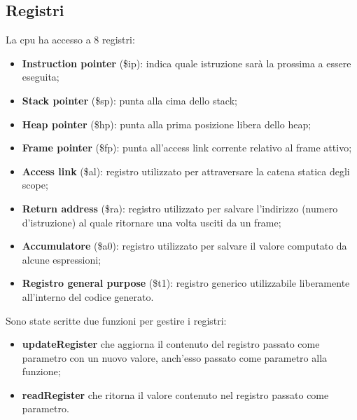 \documentclass[../main.tex]{subfiles}
\begin{document}
\subsection{Registri}
La cpu ha accesso a 8 registri:
\begin{itemize}
    \item \textbf{Instruction pointer} (\$ip): indica quale istruzione sar\`a la prossima a essere eseguita;
    \item \textbf{Stack pointer} (\$sp): punta alla cima dello stack;
    \item \textbf{Heap pointer} (\$hp): punta alla prima posizione libera dello heap;
    \item \textbf{Frame pointer} (\$fp): punta all'access link corrente relativo al frame attivo;
    \item \textbf{Access link} (\$al): registro utilizzato per attraversare la catena statica degli scope;
    \item \textbf{Return address} (\$ra): registro utilizzato per salvare l'indirizzo (numero d'istruzione) al quale ritornare una volta usciti da un frame;
    \item \textbf{Accumulatore} (\$a0): registro utilizzato per salvare il valore computato da alcune espressioni;
    \item \textbf{Registro general purpose} (\$t1): registro generico utilizzabile liberamente all'interno del codice generato.
\end{itemize}
Sono state scritte due funzioni per gestire i registri:
\begin{itemize}
    \item \textbf{updateRegister} che aggiorna il contenuto del registro passato come parametro con un nuovo valore, anch'esso passato come parametro alla funzione;
    \item \textbf{readRegister} che ritorna il valore contenuto nel registro passato come parametro.
\end{itemize}
\end{document}
